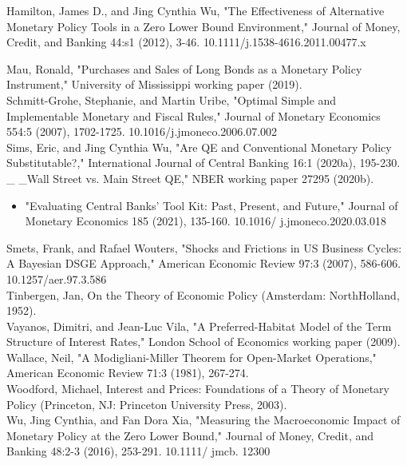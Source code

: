 \documentclass[10pt]{article}
\begin{document}
Hamilton, James D., and Jing Cynthia Wu, "The Effectiveness of Alternative Monetary Policy Tools in a Zero Lower Bound Environment," Journal of Money, Credit, and Banking 44:s1 (2012), 3-46. 10.1111/j.1538-4616.2011.00477.x

Mau, Ronald, "Purchases and Sales of Long Bonds as a Monetary Policy Instrument," University of Mississippi working paper (2019).\\
Schmitt-Grohe, Stephanie, and Martin Uribe, "Optimal Simple and Implementable Monetary and Fiscal Rules," Journal of Monetary Economics 554:5 (2007), 1702-1725. 10.1016/j.jmoneco.2006.07.002\\
Sims, Eric, and Jing Cynthia Wu, "Are QE and Conventional Monetary Policy Substitutable?," International Journal of Central Banking 16:1 (2020a), 195-230.\\
\_ \_Wall Street vs. Main Street QE," NBER working paper 27295 (2020b).

\begin{itemize}
  \item "Evaluating Central Banks' Tool Kit: Past, Present, and Future," Journal of Monetary Economics 185 (2021), 135-160. 10.1016/ j.jmoneco.2020.03.018
\end{itemize}

Smets, Frank, and Rafael Wouters, "Shocks and Frictions in US Business Cycles: A Bayesian DSGE Approach," American Economic Review 97:3 (2007), 586-606. 10.1257/aer.97.3.586\\
Tinbergen, Jan, On the Theory of Economic Policy (Amsterdam: NorthHolland, 1952).\\
Vayanos, Dimitri, and Jean-Luc Vila, "A Preferred-Habitat Model of the Term Structure of Interest Rates," London School of Economics working paper (2009).\\
Wallace, Neil, "A Modigliani-Miller Theorem for Open-Market Operations," American Economic Review 71:3 (1981), 267-274.\\
Woodford, Michael, Interest and Prices: Foundations of a Theory of Monetary Policy (Princeton, NJ: Princeton University Press, 2003).\\
Wu, Jing Cynthia, and Fan Dora Xia, "Measuring the Macroeconomic Impact of Monetary Policy at the Zero Lower Bound," Journal of Money, Credit, and Banking 48:2-3 (2016), 253-291. 10.1111/ jmcb. 12300
\end{document}
